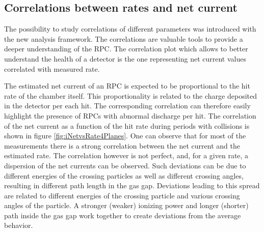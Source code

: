 \subsection{Correlations between rates and net current}
The possibility to study correlations of different parameters was introduced with the new analysis framework.
The correlations are valuable tools to provide a deeper understanding of the RPC.
The correlation plot which allows to better understand the health of a detector is the one representing net current values correlated with measured rate.

The estimated net current of an RPC is expected to be proportional to the hit rate of the chamber itself.
This proportionality is related to the charge deposited in the detector per each hit.
The corresponding correlation can therefore easily highlight the presence of RPCs with abnormal discharge per hit.
The correlation of the net current as a function of the hit rate during periods with collisions is shown in figure \ref{fig:iNetvsRate4Planes}.
One can observe that for most of the measurements there is a strong correlation between the net current and the estimated rate. 
The correlation however is not perfect, and, for a given rate, a dispersion of the net currents can be observed.
Such deviations can be due to different energies of the crossing particles as well as different crossing angles, resulting in different path length in the gas gap.
Deviations leading to this spread are related to different energies of the crossing particle and various crossing angles of the particle.
A stronger (weaker) ionizing power and longer (shorter) path inside the gas gap work together to create deviations from the average behavior.

